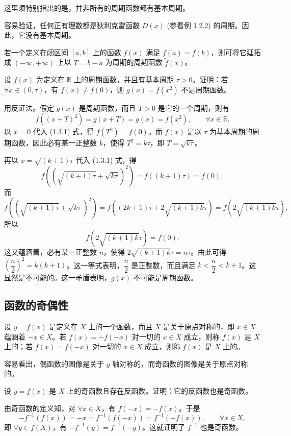 \documentclass[UTF8,12pt,a4paper,fontset=fandol]{ctexbook}
\begin{document}
这里须特别指出的是，并非所有的周期函数都有基本周期。

\noindent{}\quad 容易验证，任何正有理数都是狄利克雷函数 $D(x)$ (参看例 1.2.2) 的周期。因此，它没有基本周期。

若一个定义在闭区间 $[a,b]$ 上的函数 $f(x)$ 满足 $f(a)=f(b)$，则可将它延拓成 $(-\infty,+\infty)$ 上以 $T=b-a$ 为周期的周期函数 $\tilde f(x)$。

\noindent{}\quad 设 $f(x)$ 为定义在 $\mathbb{R}$ 上的周期函数，并且有基本周期 $\tau>0$。证明：若 $\forall x\in(0,\tau)$，有 $f(x)\ne f(0)$，则 $g(x)=f(x^2)$ 不是周期函数。

\noindent{}\quad 用反证法。假定 $g(x)$ 是周期函数，而且 $T>0$ 是它的一个周期，则有
\begin{equation}
  f((x+T)^2)=g(x+T)=g(x)=f(x^2),\qquad \forall x\in\mathbb{R}.
  \tag{1.3.1}
\end{equation}
以 $x=0$ 代入 (1.3.1) 式，得 $f(T^2)=f(0)$。而 $f(x)$ 是以 $\tau$ 为基本周期的周期函数，因此必有某一正整数 $k$，使得 $T^2=k\tau$，即 $T=\sqrt{k\tau}$。

再以 $x=\sqrt{(k+1)\tau}$ 代入 (1.3.1) 式，得
\[
  f\left(\left(\sqrt{(k+1)\tau}+\sqrt{k\tau}\right)^2\right)=f((k+1)\tau)=f(0),
\]
而
\[
  f\left(\left(\sqrt{(k+1)\tau}+\sqrt{k\tau}\right)^2\right)
  =f\left((2k+1)\tau+2\sqrt{(k+1)k}\tau\right)
  =f(2\sqrt{(k+1)k}\tau),
\]
所以
\[
  f(2\sqrt{(k+1)k}\tau)=f(0).
\]
这又蕴涵着，必有某一正整数 $n$，使得 $2\sqrt{(k+1)k}\tau=n\tau$。由此可得 $\left(\dfrac n2\right)^2=k(k+1)$。这一等式表明，$\dfrac n2$ 是正整数，而且满足 $k<\dfrac n2<k+1$。这显然是不可能的。这一矛盾表明，$g(x)$ 不可能是周期函数。

\subsection{函数的奇偶性}

设 $y=f(x)$ 是定义在 $X$ 上的一个函数，而且 $X$ 是关于原点对称的，即 $x\in X$ 蕴涵着 $-x\in X$。若 $f(x)=-f(-x)$ 对一切的 $x\in X$ 成立，则称 $f(x)$ 是 $X$ 上的；若 $f(x)=f(-x)$ 对一切的 $x\in X$ 成立，则称 $f(x)$ 是 $X$ 上的。

容易看出，偶函数的图像是关于 $y$ 轴对称的，而奇函数的图像是关于原点对称的。

\noindent{}\quad 设 $y=f(x)$ 是 $X$ 上的奇函数且存在反函数。证明：它的反函数也是奇函数。

\noindent{}\quad 由奇函数的定义知，对 $\forall x\in X$，有 $f(-x)=-f(x)$。于是
\[
  -f^{-1}(f(x))=-x=f^{-1}(f(-x))=f^{-1}(-f(x)),\qquad \forall x\in X,
\]
即 $\forall y\in f(X)$，有 $-f^{-1}(y)=f^{-1}(-y)$。这就证明了 $f^{-1}$ 也是奇函数。
\end{document}

